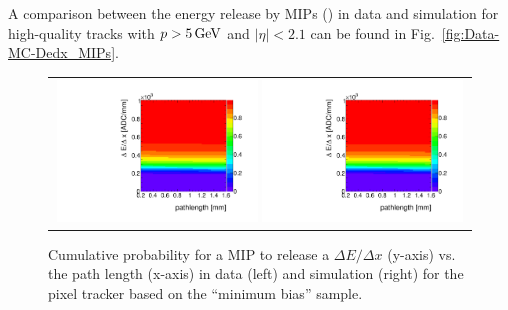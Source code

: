 A comparison between the energy release by MIPs (\ias) in data and simulation for high-quality tracks with $p>5\,\text{Ge}\kern-0.06667em\text{V}$ and $|\eta|<2.1$ can be found in Fig.~\ref{fig:Data-MC-Dedx_MIPs}.
\begin{figure}[!b]
  \centering 
  \begin{tabular}{c}
    \includegraphics[width=0.49\textwidth]{figures/analysis_2/PixelCalibration/Discriminator_template_data_pixel_2012.pdf}
    \includegraphics[width=0.49\textwidth]{figures/analysis_2/PixelCalibration/Discriminator_template_mc_pixel_2012.pdf}
  \end{tabular}
  \caption{Cumulative probability for a MIP to release a $\Delta E/ \Delta x$ (y-axis) vs. the path length (x-axis) in data (left) and simulation (right) for the pixel tracker based on the ``minimum bias'' sample.}
  \label{fig:ProbabilityTemplate}
\end{figure}

